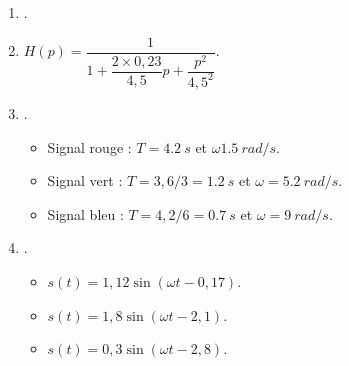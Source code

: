 \ifprof
\else


\begin{solution}
\begin{enumerate}
\item .
\item $H(p)=\dfrac{1}{1+\dfrac{2\times 0,23}{4,5}p+\dfrac{p^2}{4,5^2}}$.
\item .
\begin{itemize}
\item Signal rouge : $T=\SI{4,2}{s}$ et $\omega \SI{1,5}{rad/s}$.
\item Signal vert : $T=3,6/3 = \SI{1,2}{s}$ et $\omega= \SI{5,2}{rad/s}$.
\item Signal bleu : $T=4,2/6 = \SI{0,7}{s}$  et $\omega= \SI{9}{rad/s}$.
\end{itemize}
\item .
\begin{itemize}
\item $s(t)=1,12\sin\left(\omega t - 0,17\right)$.
\item $s(t)=1,8\sin\left(\omega t - 2,1\right)$.
\item $s(t)=0,3\sin\left(\omega t - 2,8\right)$.
\end{itemize}
\end{enumerate}
\end{solution}



\fi